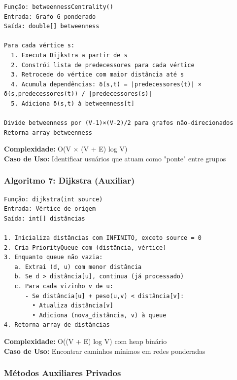 \documentclass[12pt,a4paper]{article}
\begin{document}
    \begin{verbatim}
Função: betweennessCentrality()
Entrada: Grafo G ponderado
Saída: double[] betweenness

Para cada vértice s:
  1. Executa Dijkstra a partir de s
  2. Constrói lista de predecessores para cada vértice
  3. Retrocede do vértice com maior distância até s
  4. Acumula dependências: δ(s,t) = |predecessores(t)| × δ(s,predecessores(t)) / |predecessores(s)|
  5. Adiciona δ(s,t) à betweenness[t]

Divide betweenness por (V-1)×(V-2)/2 para grafos não-direcionados
Retorna array betweenness
    \end{verbatim}

    \textbf{Complexidade:} O(V × (V + E) log V) \\
    \textbf{Caso de Uso:} Identificar usuários que atuam como "ponte" entre grupos

    \subsubsection{Algoritmo 7: Dijkstra (Auxiliar)}

    \begin{verbatim}
Função: dijkstra(int source)
Entrada: Vértice de origem
Saída: int[] distâncias

1. Inicializa distâncias com INFINITO, exceto source = 0
2. Cria PriorityQueue com (distância, vértice)
3. Enquanto queue não vazia:
   a. Extrai (d, u) com menor distância
   b. Se d > distância[u], continua (já processado)
   c. Para cada vizinho v de u:
      - Se distância[u] + peso(u,v) < distância[v]:
        • Atualiza distância[v]
        • Adiciona (nova_distância, v) à queue
4. Retorna array de distâncias
    \end{verbatim}

    \textbf{Complexidade:} O((V + E) log V) com heap binário \\
    \textbf{Caso de Uso:} Encontrar caminhos mínimos em redes ponderadas

    \subsubsection{Métodos Auxiliares Privados}
\end{document}
